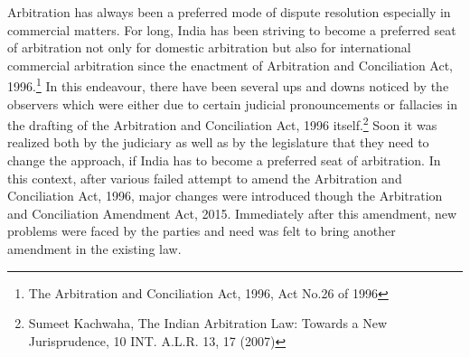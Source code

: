 \setcounter{figure}{0}
\setcounter{table}{0}
\setcounter{footnote}{0}


\begin{multicols}{2}


\noi
Arbitration has always been a preferred mode of dispute resolution especially in commercial
matters. For long, India has been striving to become a preferred seat of arbitration not only
for domestic arbitration but also for international commercial arbitration since the enactment
of Arbitration and Conciliation Act, 1996.\footnote{The Arbitration and Conciliation Act, 1996, Act No.26 of 1996} In this endeavour, there have been several ups and downs noticed by the observers which were either due to certain judicial pronouncements or fallacies in the drafting of the Arbitration and Conciliation Act, 1996 itself.\footnote{Sumeet Kachwaha, The Indian Arbitration Law: Towards a New Jurisprudence, 10 INT. A.L.R. 13, 17 (2007)}  Soon it was
realized both by the judiciary as well as by the legislature that they need to change the
approach, if India has to become a preferred seat of arbitration. In this context, after various
failed attempt to amend the Arbitration and Conciliation Act, 1996, major changes were
introduced though the Arbitration and Conciliation Amendment Act, 2015. Immediately after
this amendment, new problems were faced by the parties and need was felt to bring another
amendment in the existing law.


\end{multicols}
